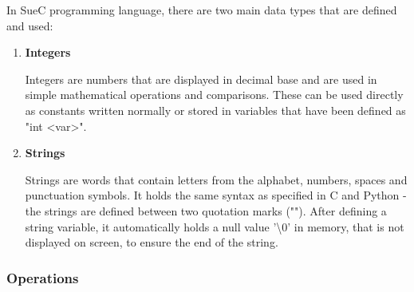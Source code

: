 \documentclass[12pt,a4paper,twoside]{report}
\begin{document}
In SueC programming language, there are two main data types that are defined and used:

\begin{enumerate}
 	\item \textbf{Integers}
 	
 	Integers are numbers that are displayed in decimal base and are used in simple mathematical operations and comparisons. These can be used directly as constants written normally or stored in variables that have been defined as "int <var>".
 	 
 	\item \textbf{Strings}
 	
 	Strings are words that contain letters from the alphabet, numbers, spaces and punctuation symbols. It holds the same syntax as specified in C and Python - the strings are defined between two quotation marks (""). After defining a string variable, it automatically holds a null value '\textbackslash 0' in memory, that is not displayed on screen, to ensure the end of the string. 
\end{enumerate}

\subsubsection{Operations}
\end{document}
